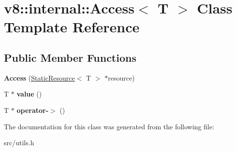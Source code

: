 \hypertarget{classv8_1_1internal_1_1_access}{}\section{v8\+:\+:internal\+:\+:Access$<$ T $>$ Class Template Reference}
\label{classv8_1_1internal_1_1_access}
\subsection*{Public Member Functions}
\begin{DoxyCompactItemize}
\item 
\hypertarget{classv8_1_1internal_1_1_access_a73d4e4a39835cc3d2314a328d80d0073}{}{\bfseries Access} (\hyperlink{classv8_1_1internal_1_1_static_resource}{Static\+Resource}$<$ T $>$ $\ast$resource)\label{classv8_1_1internal_1_1_access_a73d4e4a39835cc3d2314a328d80d0073}

\item 
\hypertarget{classv8_1_1internal_1_1_access_ab9a3512d394b376ccba107df5f3c3d67}{}T $\ast$ {\bfseries value} ()\label{classv8_1_1internal_1_1_access_ab9a3512d394b376ccba107df5f3c3d67}

\item 
\hypertarget{classv8_1_1internal_1_1_access_a71f5c7a9a355f726f309a13a5b6a8ab4}{}T $\ast$ {\bfseries operator-\/$>$} ()\label{classv8_1_1internal_1_1_access_a71f5c7a9a355f726f309a13a5b6a8ab4}

\end{DoxyCompactItemize}


The documentation for this class was generated from the following file\+:\begin{DoxyCompactItemize}
\item 
src/utils.\+h\end{DoxyCompactItemize}
